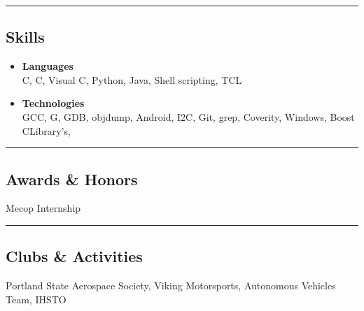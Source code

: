 \documentclass[10pt,letterpaper]{article}
\newcommand{\CPP}
{C\nolinebreak[4]\hspace{-.05em}\raisebox{.22ex}{\footnotesize\bf ++}}
\newcommand{\GPP}
{G\nolinebreak[4]\hspace{-.05em}\raisebox{.22ex}{\footnotesize\bf ++}}
\begin{document}
\hrule

\subsection*{Skills}
	\begin{itemize}
		\item 
		\textbf{Languages}\\
		 C, \CPP, Visual \CPP,  Python, Java, Shell scripting, TCL
		\item
		\textbf{Technologies}\\
		GCC, \GPP{}, GDB, objdump, Android, I2C, Git, grep, Coverity, Windows, Boost \CPP Library's, 
	\end{itemize}

\hrule

\subsection*{Awards \& Honors}
			Mecop Internship\\

\hrule

\subsection*{Clubs \& Activities}
			Portland State Aerospace Society, Viking Motorsports, Autonomous Vehicles Team, IHSTO\\
\end{document}
